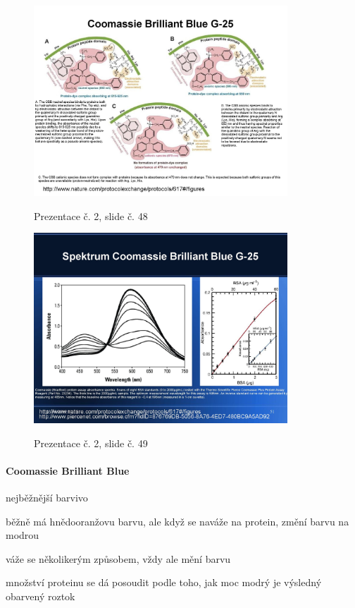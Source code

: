 \documentclass[DIV=8]{scrreprt}
\begin{document}
\begin{figure}
    \caption{Prezentace č. 2, slide č. 48}
    \includegraphics[width=0.85\textwidth]{slides-2/slide-48.jpg}
    \centering
    \label{slides-2-slide-48}
\end{figure}
\begin{figure}
    \caption{Prezentace č. 2, slide č. 49}
    \includegraphics[width=0.85\textwidth]{slides-2/slide-49.jpg}
    \centering
    \label{slides-2-slide-49}
\end{figure}

\paragraph{Coomassie Brilliant Blue}
\begin{myItemize}[nosep]
    \item nejběžnější barvivo
    \item běžně má hnědooranžovu barvu, ale když se naváže na protein, změní barvu na modrou
\begin{myItemize}[nosep]
    \item váže se několikerým způsobem, vždy ale mění barvu
    \item množství proteinu se dá posoudit podle toho, jak moc modrý je výsledný obarvený roztok
\end{myItemize}

\end{myItemize}
\end{document}
